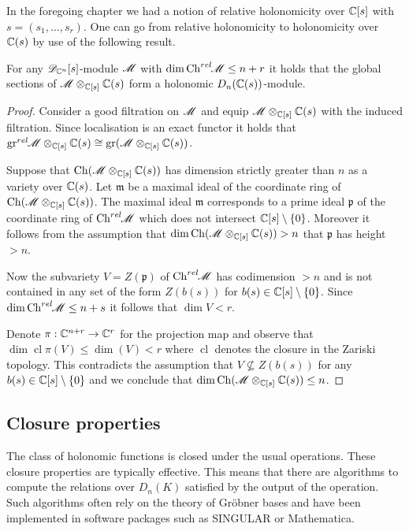 In the foregoing chapter we had a notion of relative holonomicity over $\mathbb{C}[s]$ with $s = (s_1,\ldots,s_r)$.
One can go from relative holonomicity to holonomicity over $\mathbb{C}(s)$ by use of the following result.
\begin{lemma}
    For any $\mathscr{D}_{\mathbb{C}^n}[s]$-module $\mathscr{M}$ with $\dim\operatorname{Ch}^{rel}\mkern-5mu\mathscr{M}\leq n+r$ it holds that the global sections of $\mathscr{M}\otimes_{\mathbb{C}[s]}\mathbb{C}(s)$ form a holonomic $D_n(\mathbb{C}(s))$-module.
\end{lemma}
  \begin{proof}
    Consider a good filtration on $\mathscr{M}$ and equip $\mathscr{M}\otimes_{\mathbb{C}[s]}\mathbb{C}(s)$ with the induced filtration.
    Since localisation is an exact functor it holds that $\operatorname{gr}^{rel}\mkern-5mu\mathscr{M}\otimes_{\mathbb{C}[s]}\mathbb{C}(s) \cong \operatorname{gr}(\mathscr{M}\otimes_{\mathbb{C}[s]}\mathbb{C}(s)) $.

    Suppose that $\operatorname{Ch}(\mathscr{M}\otimes_{\mathbb{C}[s]}\mathbb{C}(s))$ has dimension strictly greater than $n$ as a variety over $\mathbb{C}(s)$.
    Let $\mathfrak{m}$ be a maximal ideal of the coordinate ring of $\operatorname{Ch} (\mathscr{M}\otimes_{\mathbb{C}[s]}\mathbb{C}(s))$.
    The maximal ideal $\mathfrak{m}$ corresponds to a prime ideal $\mathfrak{p}$ of the coordinate ring of $\operatorname{Ch}^{rel}\mkern-5mu\mathscr{M}$ which does not intersect $\mathbb{C}[s]\setminus\{0\}$.
    Moreover it follows from the assumption that  $\dim\operatorname{Ch}(\mathscr{M}\otimes_{\mathbb{C}[s]}\mathbb{C}(s))> n$ that $\mathfrak{p}$ has height $>n$.

    Now the subvariety $V = Z(\mathfrak{p})$ of $\operatorname{Ch}^{rel}\mkern-5mu\mathscr{M}$ has codimension $>n$ and is not contained in any set of the form $Z(b(s))$ for $b(s)\in \mathbb{C}[s]\setminus\{0\}$.
    Since $\dim\operatorname{Ch}^{rel}\mkern-5mu\mathscr{M}\leq n+s$ it follows that $\dim V <r$.

    Denote $\pi:\mathbb{C}^{n+r}\to\mathbb{C}^r $ for the projection map and observe that $\dim\operatorname{cl}\pi(V)\leq \dim(V) < r$ where $\operatorname{cl}$ denotes the closure in the Zariski topology. %
    This contradicts the assumption that $V\nsubseteq Z(b(s))$ for any $b(s)\in \mathbb{C}[s]\setminus\{0\}$ and we conclude that $\dim \operatorname{Ch} (\mathscr{M}\otimes_{\mathbb{C}[s]}\mathbb{C}(s)) \leq n$.
    \end{proof}
    \subsection{Closure properties}
    The class of holonomic functions is closed under the usual operations.
    These closure properties are typically effective.
    This means that there are algorithms to compute the relations over $D_n(K)$ satisfied by the output of the operation.
    Such algorithms often rely on the theory of Gr\"obner bases and have been implemented in software packages such as SINGULAR or Mathematica.


